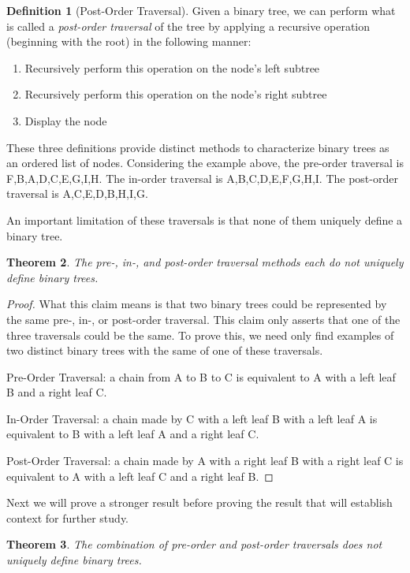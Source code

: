 \documentclass[12pt]{article}
\newtheorem{theorem}{Theorem}[section]
\theoremstyle{definition}
\newtheorem{definition}[theorem]{Definition}
\theoremstyle{remark}
\begin{document}
\begin{definition}[Post-Order Traversal]
Given a binary tree, we can perform what is called a \emph{post-order traversal} of the tree by applying a recursive operation (beginning with the root) in the following manner:
\begin{enumerate}
	\item{Recursively perform this operation on the node's left subtree}
	\item{Recursively perform this operation on the node's right subtree}
	\item{Display the node}
\end{enumerate}
\end{definition}

These three definitions provide distinct methods to characterize binary trees as an ordered list of nodes. Considering the example above, the pre-order traversal is F,B,A,D,C,E,G,I,H. The in-order traversal is A,B,C,D,E,F,G,H,I. The post-order traversal is A,C,E,D,B,H,I,G.

An important limitation of these traversals is that none of them uniquely define a binary tree.

\begin{theorem}
The pre-, in-, and post-order traversal methods each do not uniquely define binary trees.
\end{theorem}

\begin{proof}
What this claim means is that two binary trees could be represented by the same pre-, in-, or post-order traversal. This claim only asserts that one of the three traversals could be the same. To prove this, we need only find examples of two distinct binary trees with the same of one of these
traversals.

Pre-Order Traversal: a chain from A to B to C is equivalent to A with a left leaf B and a right leaf C.

In-Order Traversal: a chain made by C with a left leaf B with a left leaf A is equivalent to B with a left leaf A and a right leaf C.

Post-Order Traversal: a chain made by A with a right leaf B with a right leaf C is equivalent to A with a left leaf C and a right leaf B.
\end{proof}

Next we will prove a stronger result before proving the result that will establish context for further study.

\begin{theorem}
The combination of pre-order and post-order traversals does not uniquely define binary trees.
\end{theorem}
\end{document}
